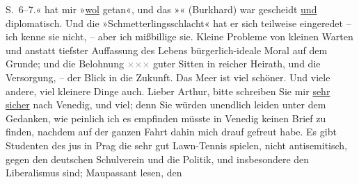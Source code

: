\begin{ledgroupsized}[t]{13cm}
{{{                            S. 6–7.}}}\label{K_L00388_1h}« hat mir »\uline{wol}
                    getan«, und das »\label{K_L00388_2v}\label{K_L00388_2h}« (Burkhard)
                    war gescheidt \uline{und} diplomatisch. Und die
                        »Schmetterlingsschlacht« hat er sich
                    teilweise eingeredet – ich kenne sie nicht, –
                    aber ich mißbillige sie. Kleine Probleme von
                    kleinen Warten und anstatt tiefster Auffassung des {\pb}Lebens bürgerlich-ideale
                    Moral auf dem Grunde; und die Belohnung \textcolor{gray}{×}\-\textcolor{gray}{×}\-\textcolor{gray}{×} guter Sitten in reicher Heirath, und die Versorgung, –
                    der Blick in die Zukunft.\pend
           \pstart
           Das Meer ist viel schöner. Und viele andere, viel kleinere Dinge auch. Lieber
                    Arthur, bitte schreiben Sie mir \uline{sehr sicher} nach
                        Venedig, und viel; denn Sie würden
                    unendlich leiden unter dem Gedanken, wie peinlich ich es empfinden müsste in
                        Venedig keinen Brief {\pb}zu finden, nachdem auf der
                    ganzen Fahrt dahin mich drauf gefreut habe.\pend
           \pstart
           Es gibt Studenten des jus in Prag die sehr
                    gut Lawn-Tennis spielen, nicht antisemitisch, gegen den deutschen Schulverein und die Politik, und insbesondere den
                    Liberalismus sind; Maupassant lesen, den

\end{ledgroupsized}
